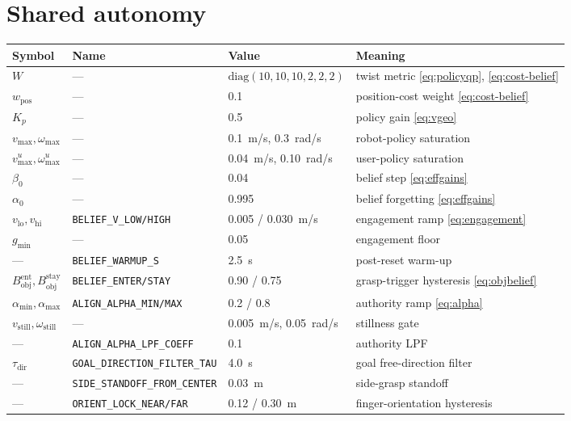 \documentclass[12pt,a4paper,twoside,openright]{report}
\begin{document}
\section{Shared autonomy}
\begin{tabularx}{\linewidth}{@{}lllX@{}}
\toprule
Symbol & Name & Value & Meaning \\
\midrule
$W$ & --- & $\mathrm{diag}(10,10,10,2,2,2)$ & twist metric \eqref{eq:policyqp}, \eqref{eq:cost-belief} \\
$w_{\text{pos}}$ & --- & 0.1 & position-cost weight \eqref{eq:cost-belief} \\
$K_p$ & --- & 0.5 & policy gain \eqref{eq:vgeo} \\
$v_{\max},\omega_{\max}$ & --- & 0.1~m/s, 0.3~rad/s & robot-policy saturation \\
$v_{\max}^{u},\omega_{\max}^{u}$ & --- & 0.04~m/s, 0.10~rad/s & user-policy saturation \\
$\beta_0$ & --- & 0.04 & belief step \eqref{eq:effgains} \\
$\alpha_0$ & --- & 0.995 & belief forgetting \eqref{eq:effgains} \\
$v_{\text{lo}}, v_{\text{hi}}$ & \texttt{BELIEF\_V\_LOW/HIGH} & 0.005 / 0.030~m/s & engagement ramp \eqref{eq:engagement} \\
$g_{\min}$ & --- & 0.05 & engagement floor \\
--- & \texttt{BELIEF\_WARMUP\_S} & 2.5~s & post-reset warm-up \\
$B_{\text{obj}}^{\text{ent}}, B_{\text{obj}}^{\text{stay}}$ & \texttt{BELIEF\_ENTER/STAY} & 0.90 / 0.75 & grasp-trigger hysteresis \eqref{eq:objbelief} \\
$\alpha_{\min},\alpha_{\max}$ & \texttt{ALIGN\_ALPHA\_MIN/MAX} & 0.2 / 0.8 & authority ramp \eqref{eq:alpha} \\
$v_{\text{still}},\omega_{\text{still}}$ & --- & 0.005~m/s, 0.05~rad/s & stillness gate \\
--- & \texttt{ALIGN\_ALPHA\_LPF\_COEFF} & 0.1 & authority LPF \\
$\tau_{\text{dir}}$ & \texttt{GOAL\_DIRECTION\_FILTER\_TAU} & 4.0~s & goal free-direction filter \\
--- & \texttt{SIDE\_STANDOFF\_FROM\_CENTER} & 0.03~m & side-grasp standoff \\
--- & \texttt{ORIENT\_LOCK\_NEAR/FAR} & 0.12 / 0.30~m & finger-orientation hysteresis \\
\bottomrule
\end{tabularx}
\end{document}
